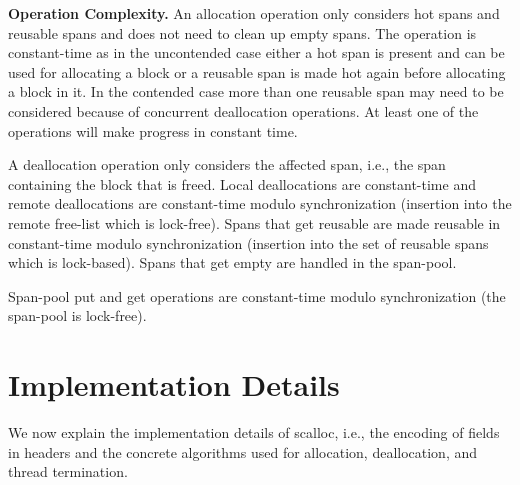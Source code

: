\documentclass[10pt]{sigplanconf}
\newcommand{\OurSubsubsection}[1]{\smallbreak\noindent\textbf{#1}\xspace}
\begin{document}
\OurSubsubsection{Operation Complexity.}
An allocation operation only considers hot spans and reusable
spans and does not need to clean up empty spans. The operation is constant-time
as in the uncontended case either a hot span is present and can be used for
allocating a block or a reusable span is made hot again before
allocating a block in it. In the contended case more than one reusable
span may need to be considered because of concurrent deallocation operations.
At least one of the operations will make progress
in constant time.

A deallocation operation only considers the affected span, i.e.,
the span containing the block that is freed.
Local deallocations are constant-time and
remote deallocations are constant-time modulo synchronization
(insertion into the remote free-list which is lock-free).
Spans that get reusable are made reusable
in constant-time modulo synchronization
(insertion into the set of reusable spans which is lock-based).
Spans that get empty are handled in the span-pool.

Span-pool put and get operations are constant-time modulo synchronization
(the span-pool is lock-free).




\section{Implementation Details}\label{sec:implementation}

We now explain the implementation details of scalloc, i.e., the encoding of
fields in headers and the concrete algorithms used for allocation, deallocation,
and thread termination.
\end{document}
